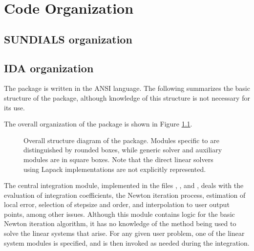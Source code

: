 \chapter{Code Organization}\label{s:organization}

\section{SUNDIALS organization}\label{ss:sun_org}


\section{IDA organization}\label{ss:ida_org}

The {\ida} package is written in the ANSI {\C} language. The following
summarizes the basic structure of the package, although knowledge
of this structure is not necessary for its use.

The overall organization of the {\ida} package is shown in Figure
\ref{f:idaorg}.
\begin{figure}
{\centerline{}}
\caption [Overall structure diagram of the {\ida} package]
{Overall structure diagram of the {\ida} package.
  Modules specific to {\ida} are distinguished by rounded boxes, while 
  generic solver and auxiliary modules are in square boxes.
  Note that the direct linear solvers using Lapack implementations are not 
  explicitly represented.}
\label{f:idaorg}
\end{figure}
The central integration module, implemented in the files ,
, and , deals with the evaluation of integration 
coefficients, the Newton iteration process, estimation of local error,
selection of stepsize and order, and interpolation to user output
points, among other issues.  Although this module contains logic for
the basic Newton iteration algorithm, it has no knowledge of the
method being used to solve the linear systems that arise.  For any
given user problem, one of the linear system modules is specified, and
is then invoked as needed during the integration. 

